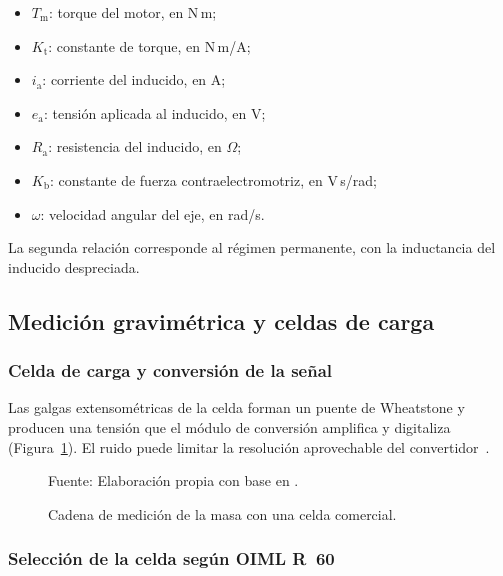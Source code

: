 \begin{itemize}[nosep, label={}, leftmargin=1.5em]
    \item $T_{\mathrm{m}}$: torque del motor, en N\,m;
    \item $K_{\mathrm{t}}$: constante de torque, en N\,m/A;
    \item $i_{\mathrm{a}}$: corriente del inducido, en A;
    \item $e_{\mathrm{a}}$: tensión aplicada al inducido, en V;
    \item $R_{\mathrm{a}}$: resistencia del inducido, en $\Omega$;
    \item $K_{\mathrm{b}}$: constante de fuerza contraelectromotriz, en V\,s/rad;
    \item $\omega$: velocidad angular del eje, en rad/s.
\end{itemize}

\medskip
\noindent La segunda relación corresponde al régimen permanente, con la inductancia
del inducido despreciada.

\subsection{Medición gravimétrica y celdas de carga}
\label{subsec:fund_medicion}

\subsubsection{Celda de carga y conversión de la señal}
\label{subsubsec:fund_conversion}

Las galgas extensométricas de la celda forman un puente de Wheatstone y producen una
tensión que el módulo de conversión amplifica y digitaliza
(Figura~\ref{fig:cadena_medicion}). El ruido puede limitar la resolución
aprovechable del convertidor~\parencite{fraden2016handbook}.

\begin{figure}[H]
    \centering
    \resizebox{0.95\textwidth}{!}{}
    \caption{Cadena de medición de la masa con una celda comercial.}
    \label{fig:cadena_medicion}
    \vspace{0.2em}
    {\footnotesize Fuente: Elaboración propia con base en
    \textcite{fraden2016handbook}.}
\end{figure}

\subsubsection{Selección de la celda según OIML R~60}
\label{subsubsec:fund_seleccion_celda}

